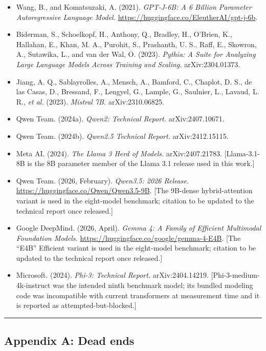 \documentclass[
]{article}
\providecommand{\tightlist}{%
  \setlength{\itemsep}{0pt}\setlength{\parskip}{0pt}}
\begin{document}
\begin{itemize}
\tightlist
\item
  Wang, B., and Komatsuzaki, A. (2021). \emph{GPT-J-6B: A 6 Billion
  Parameter Autoregressive Language Model.}
  \url{https://huggingface.co/EleutherAI/gpt-j-6b}.
\item
  Biderman, S., Schoelkopf, H., Anthony, Q., Bradley, H., O'Brien, K.,
  Hallahan, E., Khan, M. A., Purohit, S., Prashanth, U. S., Raff, E.,
  Skowron, A., Sutawika, L., and van der Wal, O. (2023). \emph{Pythia: A
  Suite for Analyzing Large Language Models Across Training and
  Scaling.} arXiv:2304.01373.
\item
  Jiang, A. Q., Sablayrolles, A., Mensch, A., Bamford, C., Chaplot, D.
  S., de las Casas, D., Bressand, F., Lengyel, G., Lample, G., Saulnier,
  L., Lavaud, L. R., \emph{et al.} (2023). \emph{Mistral 7B.}
  arXiv:2310.06825.
\item
  Qwen Team. (2024a). \emph{Qwen2: Technical Report.} arXiv:2407.10671.
\item
  Qwen Team. (2024b). \emph{Qwen2.5 Technical Report.} arXiv:2412.15115.
\item
  Meta AI. (2024). \emph{The Llama 3 Herd of Models.} arXiv:2407.21783.
  {[}Llama-3.1-8B is the 8B parameter member of the Llama 3.1 release
  used in this work.{]}
\item
  Qwen Team. (2026, February). \emph{Qwen3.5: 2026 Release.}
  \url{https://huggingface.co/Qwen/Qwen3.5-9B}. {[}The 9B-dense
  hybrid-attention variant is used in the eight-model benchmark;
  citation to be updated to the technical report once released.{]}
\item
  Google DeepMind. (2026, April). \emph{Gemma 4: A Family of Efficient
  Multimodal Foundation Models.}
  \url{https://huggingface.co/google/gemma-4-E4B}. {[}The ``E4B''
  Efficient variant is used in the eight-model benchmark; citation to be
  updated to the technical report once released.{]}
\item
  Microsoft. (2024). \emph{Phi-3: Technical Report.} arXiv:2404.14219.
  {[}Phi-3-medium-4k-instruct was the intended ninth benchmark model;
  its bundled modeling code was incompatible with current transformers
  at measurement time and it is reported as attempted-but-blocked.{]}
\end{itemize}

\begin{center}\rule{0.5\linewidth}{0.5pt}\end{center}

\subsection{Appendix A: Dead ends}\label{appendix-a-dead-ends}
\end{document}
